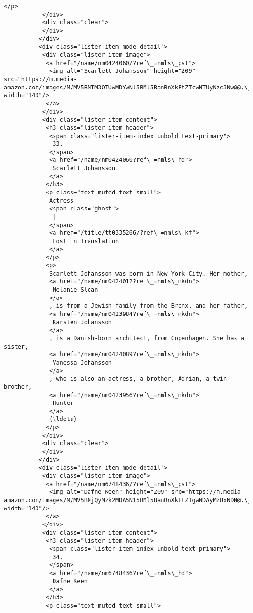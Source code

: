 \documentclass[11pt]{article}
\begin{document}
\begin{Verbatim}[commandchars=\\\{\}]
            </p>
           </div>
           <div class="clear">
           </div>
          </div>
          <div class="lister-item mode-detail">
           <div class="lister-item-image">
            <a href="/name/nm0424060/?ref\_=nmls\_pst">
             <img alt="Scarlett Johansson" height="209" src="https://m.media-amazon.com/images/M/MV5BMTM3OTUwMDYwNl5BMl5BanBnXkFtZTcwNTUyNzc3Nw@@.\_V1\_UY209\_CR16,0,140,209\_AL\_.jpg" width="140"/>
            </a>
           </div>
           <div class="lister-item-content">
            <h3 class="lister-item-header">
             <span class="lister-item-index unbold text-primary">
              33.
             </span>
             <a href="/name/nm0424060?ref\_=nmls\_hd">
              Scarlett Johansson
             </a>
            </h3>
            <p class="text-muted text-small">
             Actress
             <span class="ghost">
              |
             </span>
             <a href="/title/tt0335266/?ref\_=nmls\_kf">
              Lost in Translation
             </a>
            </p>
            <p>
             Scarlett Johansson was born in New York City. Her mother,
             <a href="/name/nm0424012?ref\_=nmls\_mkdn">
              Melanie Sloan
             </a>
             , is from a Jewish family from the Bronx, and her father,
             <a href="/name/nm0423984?ref\_=nmls\_mkdn">
              Karsten Johansson
             </a>
             , is a Danish-born architect, from Copenhagen. She has a sister,
             <a href="/name/nm0424089?ref\_=nmls\_mkdn">
              Vanessa Johansson
             </a>
             , who is also an actress, a brother, Adrian, a twin brother,
             <a href="/name/nm0423956?ref\_=nmls\_mkdn">
              Hunter
             </a>
             {\ldots}
            </p>
           </div>
           <div class="clear">
           </div>
          </div>
          <div class="lister-item mode-detail">
           <div class="lister-item-image">
            <a href="/name/nm6748436/?ref\_=nmls\_pst">
             <img alt="Dafne Keen" height="209" src="https://m.media-amazon.com/images/M/MV5BNjQyMzk2MDA5N15BMl5BanBnXkFtZTgwNDAyMzUxNDM@.\_V1\_UX140\_CR0,0,140,209\_AL\_.jpg" width="140"/>
            </a>
           </div>
           <div class="lister-item-content">
            <h3 class="lister-item-header">
             <span class="lister-item-index unbold text-primary">
              34.
             </span>
             <a href="/name/nm6748436?ref\_=nmls\_hd">
              Dafne Keen
             </a>
            </h3>
            <p class="text-muted text-small">

\end{Verbatim}
\end{document}
